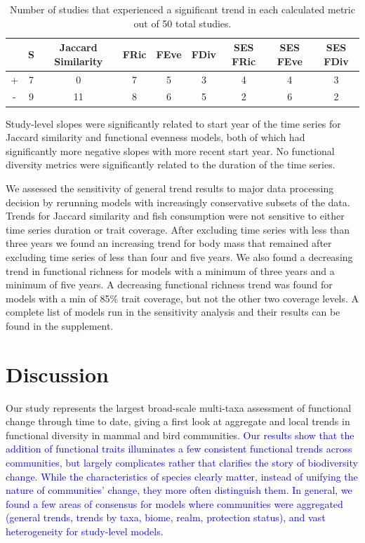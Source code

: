 \documentclass{article}
\begin{document}
\begin{table}

\caption{\label{tab:trendTab}Number of studies that experienced a significant trend in each calculated metric out of 50 total studies.}
\centering
\begin{tabular}[t]{ccccccccc}
\toprule
 & S & Jaccard Similarity & FRic & FEve & FDiv & SES FRic & SES FEve & SES FDiv\\
\midrule
+ & 7 & 0 & 7 & 5 & 3 & 4 & 4 & 3\\
- & 9 & 11 & 8 & 6 & 5 & 2 & 6 & 2\\
\bottomrule
\end{tabular}
\end{table}

Study-level slopes were significantly related to start year of the time
series for Jaccard similarity and functional evenness models, both of
which had significantly more negative slopes with more recent start
year. No functional diversity metrics were significantly related to the
duration of the time series.

We assessed the sensitivity of general trend results to major data
processing decision by rerunning models with increasingly conservative
subsets of the data. Trends for Jaccard similarity and fish consumption
were not sensitive to either time series duration or trait coverage.
After excluding time series with less than three years we found an
increasing trend for body mass that remained after excluding time series
of less than four and five years. We also found a decreasing trend in
functional richness for models with a minimum of three years and a
minimum of five years. A decreasing functional richness trend was found
for models with a min of 85\% trait coverage, but not the other two
coverage levels. A complete list of models run in the sensitivity
analysis and their results can be found in the supplement.

\hypertarget{discussion}{%
\section{Discussion}\label{discussion}}

Our study represents the largest broad-scale multi-taxa assessment of
functional change through time to date, giving a first look at aggregate
and local trends in functional diversity in mammal and bird communities.
\textcolor{blue}{Our results show that the addition of functional traits illuminates a few consistent functional trends across communities, but largely complicates rather that clarifies the story of biodiversity change. While the characteristics of species clearly matter, instead of unifying the nature of communities' change, they more often distinguish them. In general, we found a few areas of consensus for models where communities were aggregated (general trends, trends by taxa, biome, realm, protection status), and vast heterogeneity for study-level models.}
\end{document}
